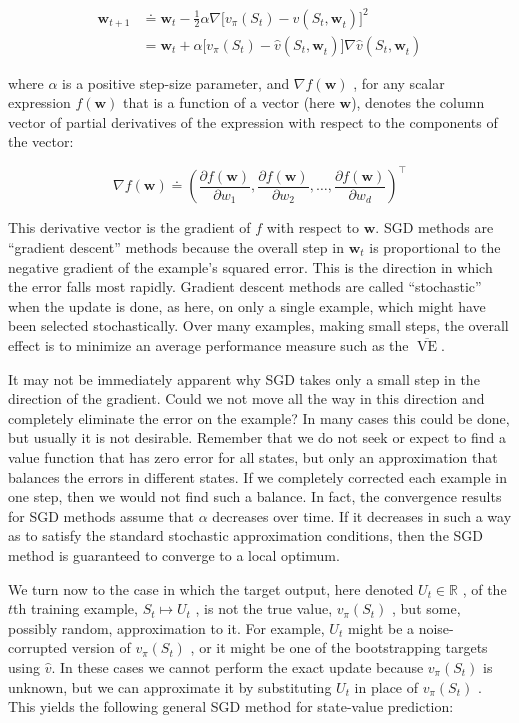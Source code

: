 \documentclass{article}
\begin{document}
$$
\begin{aligned}
\mathbf{w}_{t+1}
& \doteq \mathbf{w}_{t} - \frac{1}{2} \alpha \nabla \Big[v_{\pi }(S_{t})-\hat{v}(S_{t}\mathbf{,w}_{t})\Big]^{2} \\
& = \mathbf{w}_{t}+\alpha \Big[v_{\pi }(S_{t})-\hat{v}(S_{t}\mathbf{,w}_{t})\Big]\nabla \hat{v}(S_{t}\mathbf{,w}_{t})
\end{aligned}
$$

where $\alpha$ is a positive step-size parameter, and $\nabla f ( \mathbf { w } )$ , for any scalar expression $f ( \mathbf { w } )$ that is a function of a vector (here $\mathbf{w}$), denotes the column vector of partial derivatives of the expression with respect to the components of the vector:

$$
\nabla f ( \mathbf { w } ) \doteq \left( \frac { \partial f ( \mathbf { w } ) } { \partial w _ { 1 } } , \frac { \partial f ( \mathbf { w } ) } { \partial w _ { 2 } } , \ldots , \frac { \partial f ( \mathbf { w } ) } { \partial w _ { d } } \right) ^ { \top }
$$

This derivative vector is the gradient of $f$ with respect to $\mathbf { w }$. SGD methods are “gradient descent” methods because the overall step in $\mathbf { w } _ { t }$ is proportional to the negative gradient of the example's squared error. This is the direction in which the error falls most rapidly. 
Gradient descent methods are called “stochastic” when the update is done, as here, on only a single example, which might have been selected stochastically. Over many examples, making small steps, the overall effect is to minimize an average performance measure such as the $\overline { { \operatorname { V E } } }$.

It may not be immediately apparent why SGD takes only a small step in the direction of the gradient. Could we not move all the way in this direction and completely eliminate the error on the example? In many cases this could be done, but usually it is not desirable. Remember that we do not seek or expect to find 
a value function that has zero error for all states, but only an approximation that balances the errors in different states. If we completely corrected each example in one step, then we would not find such a balance. In fact, the convergence results for SGD methods assume that $\alpha$ decreases over time. 
If it decreases in such a way as to satisfy the standard stochastic approximation conditions, then the SGD method is guaranteed to converge to a local optimum.

We turn now to the case in which the target output, here denoted $U _ { t } \in \mathbb { R }$ , of the $t$th training example, $S _ { t } \mapsto U _ { t }$ , is not the true value, $v _ { \pi } ( S _ { t } )$ , but some, possibly random, approximation to it. For example, $U _ { t }$ might be a noise-corrupted version 
of $v _ { \pi } ( S _ { t } )$ , or it might be one of the bootstrapping targets using $\hat { v }$. In these cases we cannot perform the exact update because $v _ { \pi } ( S _ { t } )$ is unknown, but we can approximate it by substituting $U _ { t }$ in place of $v _ { \pi } ( S _ { t } )$ . 
This yields the following general SGD method for state-value prediction:
\end{document}
